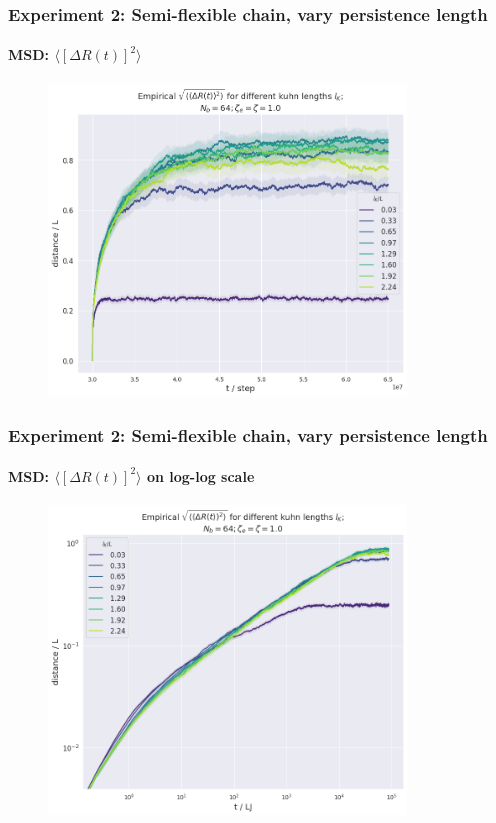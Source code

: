 \documentclass[handout]{beamer}
\newcommand{\mean}[1]{\langle #1 \rangle}
\begin{document}
\begin{frame}
    \frametitle{Experiment 2: Semi-flexible chain, vary persistence length}
    \framesubtitle{MSD: $\mean{[\Delta R(t)]^2}$}

    \begin{figure}[h]
        \includegraphics[width=9.5cm]{./4-exp-delta_R-bare.png}
    \end{figure}
\end{frame}

\begin{frame}
    \frametitle{Experiment 2: Semi-flexible chain, vary persistence length}
    \framesubtitle{MSD: $\mean{[\Delta R(t)]^2}$ on log-log scale}

    \begin{figure}[h]
        \includegraphics[width=9.5cm]{./4-exp-msd-log.png}
    \end{figure}
\end{frame}
\end{document}
